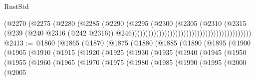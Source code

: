 \begin{lexlean}{RustStd}
\begin{coremodule}
                                                                      (@2270
                                                                        (@2275
                                                                          (@2280
                                                                            (@2285
                                                                              (@2290
                                                                                (@2295
                                                                                  (@2300
                                                                                    (@2305
                                                                                      (@2310
                                                                                        (@2315
                                                                                          (@239
                                                                                            (@240
                                                                                              @2316
                                                                                              (@242
                                                                                                @2316))
                                                                                            @246))))))))))))))))))))))))))))))))))))))))))))
@2413 := @1860
    (@1865
      (@1870
        (@1875
          (@1880
            (@1885
              (@1890
                (@1895
                  (@1900
                    (@1905
                      (@1910
                        (@1915
                          (@1920
                            (@1925
                              (@1930
                                (@1935
                                  (@1940
                                    (@1945
                                      (@1950
                                        (@1955
                                          (@1960
                                            (@1965
                                              (@1970
                                                (@1975
                                                  (@1980
                                                    (@1985
                                                      (@1990
                                                        (@1995
                                                          (@2000
                                                            (@2005

\end{coremodule}
\end{lexlean}
